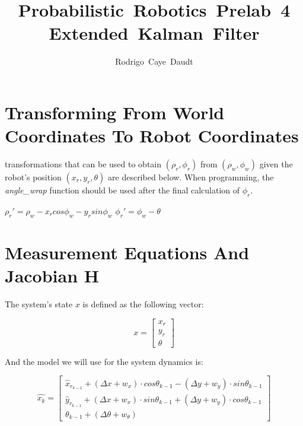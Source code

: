 \documentclass[journal]{IEEEtran}
\begin{document}
\title{Probabilistic~Robotics~Prelab~4 \\ Extended~Kalman~Filter}
%

\author{Rodrigo~Caye~Daudt}





\maketitle



\section{Transforming From World Coordinates To Robot Coordinates}\label{aaa}

 transformations that can be used to obtain $(\rho_r,\phi_r)$ from $(\rho_w,\phi_w)$ given the robot's position $(x_r,y_r,\theta)$ are described below. When programming, the \textit{angle\_wrap} function should be used after the final calculation of $\phi_r$.

\begin{algorithm}
$\rho_r ' = \rho_w - x_r cos\phi_w - y_r sin \phi_w$\;
$\phi_r ' = \phi_w - \theta$\;
\end{algorithm}



\section{Measurement Equations And Jacobian H}

The system's state $x$ is defined as the following vector:

\[
x = 
\begin{bmatrix}
x_r \\
y_r \\
\theta
\end{bmatrix}
\]

And the model we will use for the system dynamics is:

\[
\hat{x_k} = 
\begin{bmatrix}
\hat{x}_{r_{k-1}} + (\Delta x + w_x) \cdot cos \theta_{k-1} - (\Delta y + w_y) \cdot sin \theta_{k-1} \\
\hat{y}_{r_{k-1}} + (\Delta x + w_x) \cdot sin \theta_{k-1} + (\Delta y + w_y) \cdot cos \theta_{k-1} \\
\theta_{k-1} + (\Delta \theta + w_\theta)
\end{bmatrix}
\]
\end{document}

